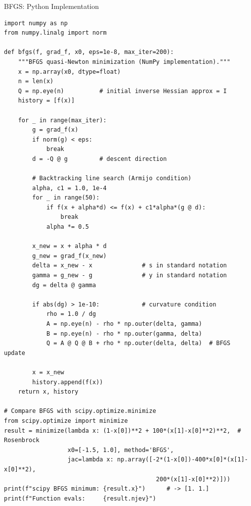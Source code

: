 \documentclass[aspectratio=169,10pt]{beamer}
\begin{document}
\begin{frame}[fragile]{BFGS: Python Implementation}
\begin{lstlisting}[caption={BFGS quasi-Newton method in Python}]
import numpy as np
from numpy.linalg import norm

def bfgs(f, grad_f, x0, eps=1e-8, max_iter=200):
    """BFGS quasi-Newton minimization (NumPy implementation)."""
    x = np.array(x0, dtype=float)
    n = len(x)
    Q = np.eye(n)          # initial inverse Hessian approx = I
    history = [f(x)]

    for _ in range(max_iter):
        g = grad_f(x)
        if norm(g) < eps:
            break
        d = -Q @ g         # descent direction

        # Backtracking line search (Armijo condition)
        alpha, c1 = 1.0, 1e-4
        for _ in range(50):
            if f(x + alpha*d) <= f(x) + c1*alpha*(g @ d):
                break
            alpha *= 0.5

        x_new = x + alpha * d
        g_new = grad_f(x_new)
        delta = x_new - x              # s in standard notation
        gamma = g_new - g              # y in standard notation
        dg = delta @ gamma

        if abs(dg) > 1e-10:            # curvature condition
            rho = 1.0 / dg
            A = np.eye(n) - rho * np.outer(delta, gamma)
            B = np.eye(n) - rho * np.outer(gamma, delta)
            Q = A @ Q @ B + rho * np.outer(delta, delta)  # BFGS update

        x = x_new
        history.append(f(x))
    return x, history

# Compare BFGS with scipy.optimize.minimize
from scipy.optimize import minimize
result = minimize(lambda x: (1-x[0])**2 + 100*(x[1]-x[0]**2)**2,  # Rosenbrock
                  x0=[-1.5, 1.0], method='BFGS',
                  jac=lambda x: np.array([-2*(1-x[0])-400*x[0]*(x[1]-x[0]**2),
                                           200*(x[1]-x[0]**2)]))
print(f"scipy BFGS minimum: {result.x}")      # -> [1. 1.]
print(f"Function evals:     {result.njev}")
\end{lstlisting}
\end{frame}

\end{document}
